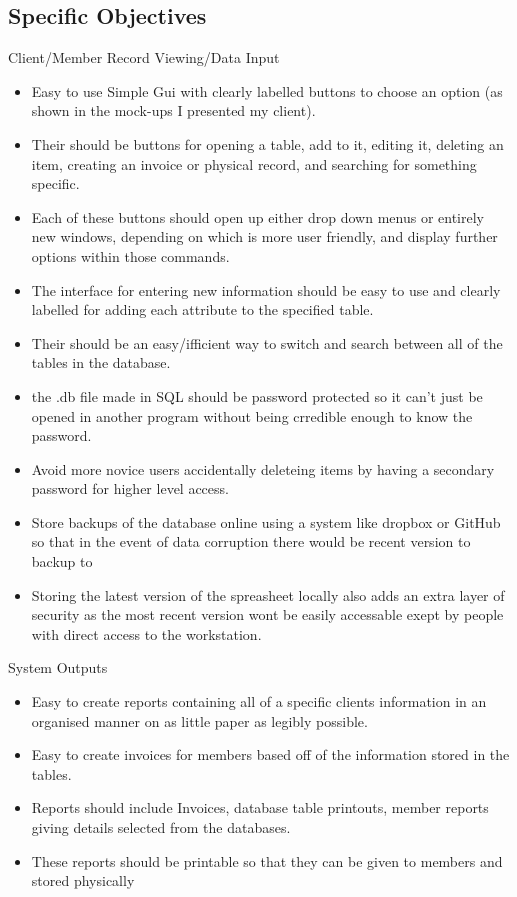\subsection{Specific Objectives}

Client/Member Record Viewing/Data Input

\begin{itemize}  

        \item Easy to use Simple Gui with clearly labelled buttons to choose an option (as shown in the mock-ups I presented my client).
        \item Their should be buttons for opening a table, add to it, editing it, deleting an item, creating an invoice or physical record, and searching for something specific.
        \item Each of these buttons should open up either drop down menus or entirely new windows, depending on which is more user friendly, and display further options within those commands.
        \item The interface for entering new information should be easy to use and clearly labelled for adding each attribute to the specified table.
        \item Their should be an easy/ifficient way to switch and search between all of the tables in the database.
        \item the .db file made in SQL should be password protected so it can't just be opened in another program without being crredible enough to know the password.
        \item Avoid more novice users accidentally deleteing items by having a secondary password for higher level access.
        \item Store backups of the database online using a system like dropbox or GitHub so that in the event of data corruption there would be recent version to backup to
        \item Storing the latest version of the spreasheet locally also adds an extra layer of security as the most recent version wont be easily accessable exept by people with direct access to the workstation.
    \end{itemize}


System Outputs

\begin{itemize}  

        \item Easy to create reports containing all of a specific clients information in an organised manner on as little paper as legibly possible.
        \item Easy to create invoices for members based off of the information stored in the tables.
        \item Reports should include Invoices, database table printouts, member reports giving details selected from the databases.
        \item These reports should be printable so that they can be given to members and stored physically
        
\end{itemize}

